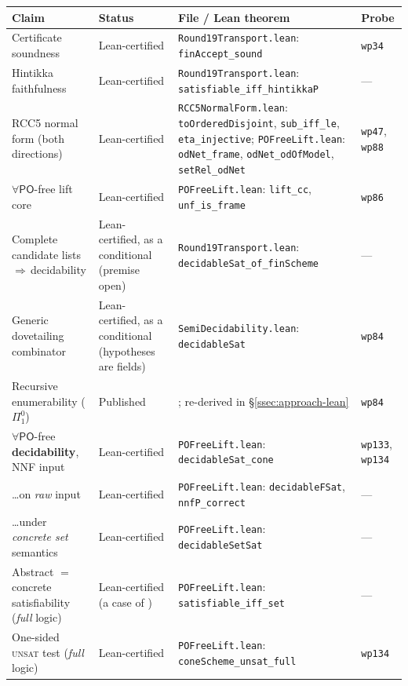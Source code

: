 \documentclass[11pt]{article}
\newcommand{\PO}{\mathsf{PO}}
\newcommand{\code}[1]{\texttt{#1}}
\theoremstyle{plain}
\theoremstyle{definition}
\begin{document}
\begin{table}[!htbp]
\centering
\footnotesize
\renewcommand{\arraystretch}{1.2}
\begin{tabular}{@{}L{0.235\textwidth}L{0.115\textwidth}L{0.40\textwidth}L{0.11\textwidth}@{}}
\toprule
\textbf{Claim} & \textbf{Status} & \textbf{File / Lean theorem} & \textbf{Probe}\\
\midrule
Certificate soundness & Lean-certified & \texttt{Round19Transport.lean}: \code{finAccept\_sound} & \texttt{wp34}\\
Hintikka faithfulness & Lean-certified & \texttt{Round19Transport.lean}: \code{satisfiable\_iff\_hintikkaP} & ---\\
RCC5 normal form (both directions) & Lean-certified & \texttt{RCC5NormalForm.lean}: \code{toOrderedDisjoint}, \code{sub\_iff\_le}, \code{eta\_injective}; \texttt{POFreeLift.lean}: \code{odNet\_frame}, \code{odNet\_odOfModel}, \code{setRel\_odNet} & \texttt{wp47}, \texttt{wp88}\\
$\forall\PO$-free lift core & Lean-certified & \texttt{POFreeLift.lean}: \code{lift\_cc}, \code{unf\_is\_frame} & \texttt{wp86}\\
Complete candidate lists\,$\Rightarrow$\,decidability & Lean-certified, as a conditional (premise open) & \texttt{Round19Transport.lean}: \code{decidableSat\_of\_finScheme} & ---\\
Generic dovetailing combinator & Lean-certified, as a conditional (hypotheses are fields) & \texttt{SemiDecidability.lean}: \code{decidableSat} & \texttt{wp84}\\
Recursive enumerability ($\Pi^0_1$) & Published & \cite[Thm.~28]{LutzWolter2006}; re-derived in \S\ref{ssec:approach-lean} & \texttt{wp84}\\
\addlinespace
$\forall\PO$-free \textbf{decidability}, NNF input & Lean-certified & \texttt{POFreeLift.lean}: \code{decidableSat\_cone} & \texttt{wp133}, \texttt{wp134}\\
\quad\ldots on \emph{raw} input & Lean-certified & \texttt{POFreeLift.lean}: \code{decidableFSat}, \code{nnfP\_correct} & ---\\
\quad\ldots under \emph{concrete set} semantics & Lean-certified & \texttt{POFreeLift.lean}: \code{decidableSetSat} & ---\\
Abstract $=$ concrete satisfiability (\emph{full} logic) & Lean-certified (a case of \cite[Thm.~23]{LutzWolter2006}) & \texttt{POFreeLift.lean}: \code{satisfiable\_iff\_set} & ---\\
One-sided \textsc{unsat} test (\emph{full} logic) & Lean-certified & \texttt{POFreeLift.lean}: \code{coneScheme\_unsat\_full} & \texttt{wp134}\\

\end{tabular}
\end{table}
\end{document}
